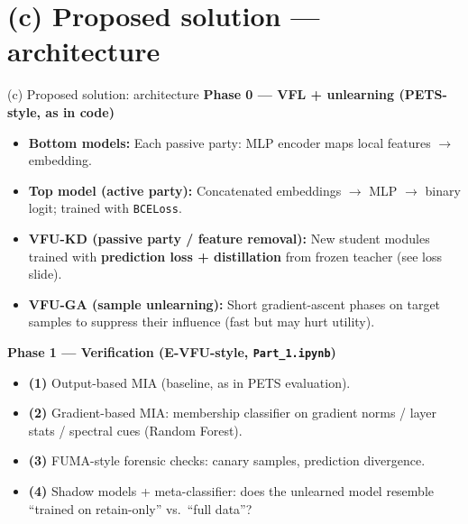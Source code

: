 \documentclass[11pt,aspectratio=169]{beamer}
\begin{document}
\section*{(c) Proposed solution --- architecture}
\begin{frame}{(c) Proposed solution: architecture}
  \textbf{Phase 0 --- VFL + unlearning (PETS-style, as in code)}
  \begin{itemize}
    \item \textbf{Bottom models:} Each passive party: MLP encoder maps local features $\to$ embedding.
    \item \textbf{Top model (active party):} Concatenated embeddings $\to$ MLP $\to$ binary logit; trained with \texttt{BCELoss}.
    \item \textbf{VFU-KD (passive party / feature removal):} New student modules trained with \textbf{prediction loss + distillation} from frozen teacher (see loss slide).
    \item \textbf{VFU-GA (sample unlearning):} Short gradient-ascent phases on target samples to suppress their influence (fast but may hurt utility).
  \end{itemize}
  \vspace{0.35em}
  \textbf{Phase 1 --- Verification (E-VFU-style, \texttt{Part\_1.ipynb})}
  \begin{itemize}
    \item \textbf{(1)} Output-based MIA (baseline, as in PETS evaluation).
    \item \textbf{(2)} Gradient-based MIA: membership classifier on gradient norms / layer stats / spectral cues (Random Forest).
    \item \textbf{(3)} FUMA-style forensic checks: canary samples, prediction divergence.
    \item \textbf{(4)} Shadow models + meta-classifier: does the unlearned model resemble ``trained on retain-only'' vs.\ ``full data''?
  \end{itemize}
\end{frame}

\end{document}
